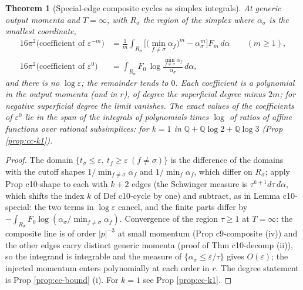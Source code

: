 \documentclass[11pt]{article}
\numberwithin{equation}{section}
\theoremstyle{plain}
\newtheorem{theorem}{Theorem}[section]
\theoremstyle{definition}
\begin{document}
\begin{theorem}[Special-edge composite cycles as simplex integrals]
\label{thm:cc-simplex}
At generic output momenta and $T=\infty$, with $R_\sigma$ the region of the simplex where $\alpha_\sigma$ is the smallest coordinate,
\begin{equation}
\begin{aligned}
16\pi^2\big(\text{coefficient of }\varepsilon^{-m}\big)&=\frac1m\int_{R_\sigma}\Big[\big(\min_{f\ne\sigma}\alpha_f\big)^m-\alpha_\sigma^m\Big]F_m\,d\alpha\qquad(m\ge1),\\
16\pi^2\big(\text{coefficient of }\varepsilon^{0}\big)&=\int_{R_\sigma}F_0\,\log\frac{\min_{f\ne\sigma}\alpha_f}{\alpha_\sigma}\,d\alpha,
\end{aligned}
\label{eq:cc-simplex}
\end{equation}
and there is no $\log\varepsilon$; the remainder tends to $0$. Each coefficient is a polynomial in the output momenta (and in $r$), of degree the superficial degree minus $2m$; for negative superficial degree the limit vanishes. The exact values of the coefficients of $\varepsilon^0$ lie in the span of the integrals of polynomials times $\log$ of ratios of affine functions over rational subsimplices: for $k=1$ in $\mathbb Q+\mathbb Q\log2+\mathbb Q\log3$ (Prop \ref{prop:cc-k1}).
\end{theorem}

\begin{proof}
The domain $\{t_\sigma\le\varepsilon,\ t_f\ge\varepsilon\ (f\ne\sigma)\}$ is the difference of the domains with the cutoff shapes $1/\min_{f\ne\sigma}\alpha_f$ and $1/\min_f\alpha_f$, which differ on $R_\sigma$; apply Prop c10-shape to each with $k+2$ edges (the Schwinger measure is $\tau^{k+1}d\tau\,d\alpha$, which shifts the index $k$ of Def c10-cycle by one) and subtract, as in Lemma c10-special: the two terms in $\log\varepsilon$ cancel, and the finite parts differ by $-\int_{R_\sigma}F_0\log(\alpha_\sigma/\min_{f\ne\sigma}\alpha_f)$. Convergence of the region $\tau\ge1$ at $T=\infty$: the composite line is of order $|p|^{-3}$ at small momentum (Prop c9-composite (iv)) and the other edges carry distinct generic momenta (proof of Thm c10-decomp (ii)), so the integrand is integrable and the measure of $\{\alpha_\sigma\le\varepsilon/\tau\}$ gives $O(\varepsilon)$; the injected momentum enters polynomially at each order in $r$. The degree statement is Prop \ref{prop:cc-bound} (i). For $k=1$ see Prop \ref{prop:cc-k1}.
\end{proof}
\end{document}
